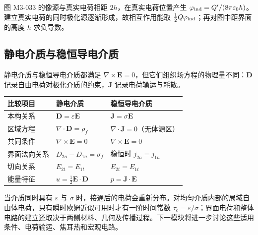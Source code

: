 图 M3-033 的像源与真实电荷相距 \(2h\)，在真实电荷位置产生
\(\varphi_{\rm ind}=Q^{\prime}/(8\pi\varepsilon_0h)\)。建立真实电荷的同时极化源逐渐形成，故相互作用能取
\(\tfrac12Q\varphi_{\rm ind}\)；再对图中距界面的高度 \(h\) 求负导数。

\subsection{静电介质与稳恒导电介质}\label{m3:ux9759ux7535ux4ecbux8d28ux4e0eux7a33ux6052ux5bfcux7535ux4ecbux8d28}

静电介质与稳恒导电介质都满足
\(\nabla\times\mathbf E=0\)，但它们组织场方程的物理量不同：\(\mathbf D\)
记录自由电荷对极化介质的约束，\(\mathbf J\) 记录电荷输运与耗散。

{\def\LTcaptype{none} %
\begin{longtable}[]{@{}
  >{\raggedright\arraybackslash}p{}
  >{\raggedright\arraybackslash}p{}
  >{\raggedright\arraybackslash}p{}@{}}
\toprule\noalign{}
\begin{minipage}[b]{\linewidth}\raggedright
比较项目
\end{minipage} & \begin{minipage}[b]{\linewidth}\raggedright
静电介质
\end{minipage} & \begin{minipage}[b]{\linewidth}\raggedright
稳恒导电介质
\end{minipage} \\
\midrule\noalign{}
\endhead
\bottomrule\noalign{}
\endlastfoot
本构关系 & \(\mathbf D=\varepsilon\mathbf E\) &
\(\mathbf J=\sigma\mathbf E\) \\
区域方程 & \(\nabla\cdot\mathbf D=\rho_f\) &
\(\nabla\cdot\mathbf J=0\)（无体源区） \\
共同条件 & \(\nabla\times\mathbf E=0\) & \(\nabla\times\mathbf E=0\) \\
界面法向关系 & \(D_{2n}-D_{1n}=\sigma_f\) & 稳恒时 \(j_{2n}=j_{1n}\) \\
切向关系 & \(E_{2t}=E_{1t}\) & \(E_{2t}=E_{1t}\) \\
能量特征 & \(u=\tfrac12\mathbf E\cdot\mathbf D\) &
\(p=\mathbf J\cdot\mathbf E\) \\
\end{longtable}
}

当介质同时具有 \(\varepsilon\) 与 \(\sigma\)
时，接通后的电荷会重新分布。对均匀介质内部的局域自由体电荷，只有瞬时欧姆近似可用时才有一阶时间常数
\(\tau_c=\varepsilon/\sigma\)；界面电荷和整体电路的建立还取决于两侧材料、几何及传播过程。下一模块将进一步讨论这些适用条件、电荷输运、焦耳热和宏观电路。
\clearpage
\endgroup
